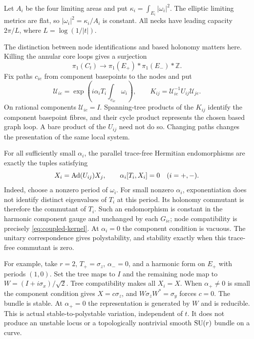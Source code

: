 Let $A_i$ be the four limiting areas and put
$\kappa_i=\int_{E_i}|\omega_i|^2$.
The elliptic limiting metrics are flat, so
$|\omega_i|^2=\kappa_i/A_i$ is constant.
All necks have leading capacity $2\pi/L$, where
$L=\log(1/|t|)$.

The distinction between node identifications
and based holonomy matters here.
Killing the annular core loops gives a
surjection
\[
 \pi_1(C_t)\longrightarrow
 \pi_1(E_+)*\pi_1(E_-)*\mathbb Z .
\]
Fix paths $c_{ie}$ from component basepoints
to the nodes and put
\[
 \mathcal U_{ie}=\exp\left(i\alpha_iT_i
                       \int_{c_{ie}}\omega_i\right),
 \qquad K_{ij}=\mathcal U_{ie}^{-1}U_{ij}\mathcal U_{je}.
\]
On rational components $\mathcal U_{ie}=I$.
Spanning-tree products of the $K_{ij}$ identify
the component basepoint fibres, and their cycle
product represents the chosen based graph loop.
A bare product of the $U_{ij}$ need not do so.
Changing paths changes the presentation of
the same local system.

For all sufficiently small $\alpha_i$, the
parallel trace-free Hermitian endomorphisms
are exactly the tuples satisfying
\begin{equation}\label{eq:coupled-kernel}
 X_i=\operatorname{Ad}(U_{ij})X_j,\qquad
 \alpha_i[T_i,X_i]=0\quad(i=+,-).
\end{equation}
Indeed, choose a nonzero period of $\omega_i$.
For small nonzero $\alpha_i$, exponentiation
does not identify distinct eigenvalues of
$T_i$ at this period. Its holonomy commutant
is therefore the commutant of $T_i$.
Such an endomorphism is constant in the
harmonic component gauge and unchanged by
each $G_{ie}$; node compatibility is precisely
\eqref{eq:coupled-kernel}. At $\alpha_i=0$
the component condition is vacuous.
The unitary correspondence \cite{narasimhan-seshadri} gives
polystability, and stability exactly when this
trace-free commutant is zero.

For example, take $r=2$, $T_+=\sigma_z$,
$\alpha_-=0$, and a harmonic form on $E_+$
with periods $(1,0)$. Set the tree maps to
$I$ and the remaining node map to
$W=(I+i\sigma_x)/\sqrt2$.
Tree compatibility makes all $X_i=X$.
When $\alpha_+\ne0$ is small the component
condition gives $X=c\sigma_z$, and
$W\sigma_zW^*=\sigma_y$ forces $c=0$.
The bundle is stable. At $\alpha_+=0$ the
representation is generated by $W$ and is
reducible. This is actual stable-to-polystable
variation, independent of $t$. It does not
produce an unstable locus or a topologically
nontrivial smooth $\operatorname{SU}(r)$ bundle on a curve.

